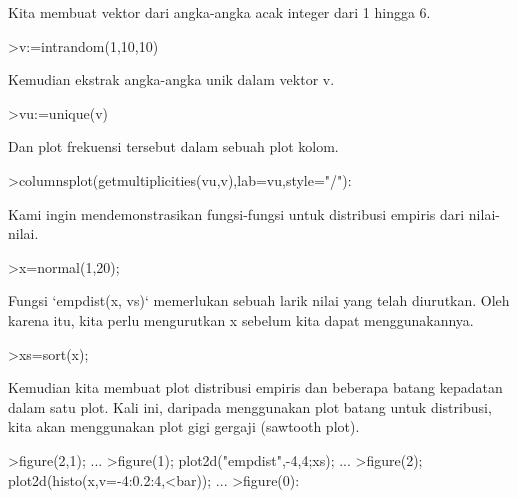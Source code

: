 \documentclass[a4paper,10pt]{article}
\begin{document}
\begin{eulernotebook}
\begin{eulercomment}
Kita membuat vektor dari angka-angka acak integer dari 1 hingga 6.
\end{eulercomment}
\begin{eulerprompt}
>v:=intrandom(1,10,10)
\end{eulerprompt}
\begin{euleroutput}
  [4,  5,  2,  6,  1,  10,  8,  4,  1,  2]
\end{euleroutput}
\begin{eulercomment}
Kemudian ekstrak angka-angka unik dalam vektor v.
\end{eulercomment}
\begin{eulerprompt}
>vu:=unique(v)
\end{eulerprompt}
\begin{euleroutput}
  [1,  2,  4,  5,  6,  8,  10]
\end{euleroutput}
\begin{eulercomment}
Dan plot frekuensi tersebut dalam sebuah plot kolom.
\end{eulercomment}
\begin{eulerprompt}
>columnsplot(getmultiplicities(vu,v),lab=vu,style="/"):
\end{eulerprompt}
\begin{eulercomment}
Kami ingin mendemonstrasikan fungsi-fungsi untuk distribusi empiris
dari nilai-nilai.
\end{eulercomment}
\begin{eulerprompt}
>x=normal(1,20);
\end{eulerprompt}
\begin{eulercomment}
Fungsi `empdist(x, vs)` memerlukan sebuah larik nilai yang telah
diurutkan. Oleh karena itu, kita perlu mengurutkan x sebelum kita
dapat menggunakannya.
\end{eulercomment}
\begin{eulerprompt}
>xs=sort(x);
\end{eulerprompt}
\begin{eulercomment}
Kemudian kita membuat plot distribusi empiris dan beberapa batang
kepadatan dalam satu plot. Kali ini, daripada menggunakan plot batang
untuk distribusi, kita akan menggunakan plot gigi gergaji (sawtooth
plot).
\end{eulercomment}
\begin{eulerprompt}
>figure(2,1); ...
>figure(1); plot2d("empdist",-4,4;xs); ...
>figure(2); plot2d(histo(x,v=-4:0.2:4,<bar));  ...
>figure(0):
\end{eulerprompt}

\end{eulernotebook}
\end{document}
